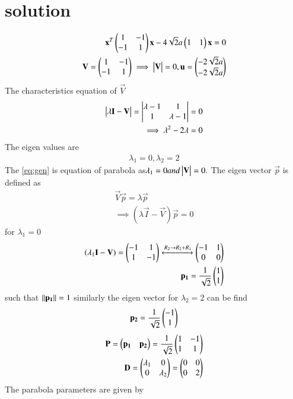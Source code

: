 \documentclass[journal,12pt,twocolumn]{IEEEtran}
\begin{document}
\section{solution}
\begin{align}
\mathbf{x}^T\begin{pmatrix}1&-1\\-1&1\end{pmatrix}\mathbf{x}-4\sqrt{2}a\begin{pmatrix}1&1\end{pmatrix}\mathbf{x}=0 \label{eq:gen}\\
\mathbf{V}=\begin{pmatrix}1&-1\\-1&1\end{pmatrix}\implies\begin{vmatrix}\mathbf{V}\end{vmatrix}=0,\mathbf{u}=\begin{pmatrix}-2\sqrt{2}a\\-2\sqrt{2}a\end{pmatrix}
\end{align}
The characteristics equation of $\vec{V}$
\begin{align}
\begin{vmatrix}\lambda\mathbf{I}-\mathbf{V}\end{vmatrix}=\begin{vmatrix}\lambda-1&1\\1&\lambda-1\end{vmatrix}=0\\
\implies\lambda^{2}-2\lambda=0
\end{align}
The eigen values are
\begin{align}
  \lambda{_1}=0,\lambda{_2} =2
\end{align}
 The \eqref{eq:gen} is equation of parabola as$\lambda{_1}=0 and \begin{vmatrix}\mathbf{V}\end{vmatrix}=0.$ 
The eigen vector $\vec{p}$ is defined as
\begin{align}
    \vec{V}\vec{p}=\lambda{\vec{p}}\\
    \implies(\lambda{\vec{I}}-\vec{V})\vec{p}=0
\end{align}
for $\lambda{_1}=0$
\begin{align}
(\lambda{_1}\mathbf{I}-\mathbf{V})= \begin{pmatrix}-1&1\\1&-1\end{pmatrix}\xleftrightarrow[]{R_2\rightarrow{R_2+R_1}}\begin{pmatrix}-1&1\\0&0\end{pmatrix}\\\mathbf{p_1}=\frac{1}{\sqrt{2}}\begin{pmatrix}1\\1\end{pmatrix}
\end{align}
such that $\lVert\mathbf{p_1}\rVert=1$ similarly the eigen vector for $\lambda{_2}=2$ can be find
\begin{align}
    \mathbf{p_2}=\frac{1}{\sqrt{2}}\begin{pmatrix}-1\\1\end{pmatrix}
\end{align}
\begin{align}
\mathbf{P}=\begin{pmatrix}\mathbf{p_1}&\mathbf{p_2}\end{pmatrix}=\frac{1}{\sqrt{2}}\begin{pmatrix}1&-1\\1&1\end{pmatrix}\\
\mathbf{D}=\begin{pmatrix}\lambda_1&0\\0&\lambda_2\end{pmatrix}=\begin{pmatrix}0&0\\0&2\end{pmatrix}
\end{align}
The parabola parameters are given by
\end{document}
